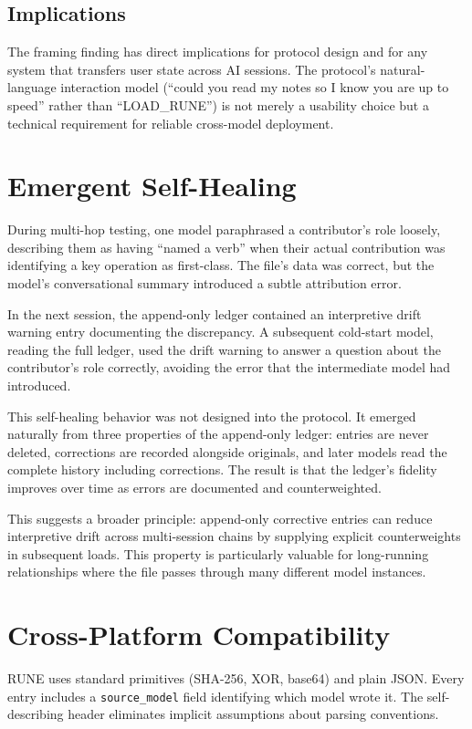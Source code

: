 \documentclass[11pt,a4paper]{article}
\begin{document}
\subsection{Implications}

The framing finding has direct implications for protocol design and for any system that transfers user state across AI sessions. The protocol's natural-language interaction model (``could you read my notes so I know you are up to speed'' rather than ``LOAD\_RUNE'') is not merely a usability choice but a technical requirement for reliable cross-model deployment.

\section{Emergent Self-Healing}

During multi-hop testing, one model paraphrased a contributor's role loosely, describing them as having ``named a verb'' when their actual contribution was identifying a key operation as first-class. The file's data was correct, but the model's conversational summary introduced a subtle attribution error.

In the next session, the append-only ledger contained an interpretive drift warning entry documenting the discrepancy. A subsequent cold-start model, reading the full ledger, used the drift warning to answer a question about the contributor's role correctly, avoiding the error that the intermediate model had introduced.

This self-healing behavior was not designed into the protocol. It emerged naturally from three properties of the append-only ledger: entries are never deleted, corrections are recorded alongside originals, and later models read the complete history including corrections. The result is that the ledger's fidelity improves over time as errors are documented and counterweighted.

This suggests a broader principle: append-only corrective entries can reduce interpretive drift across multi-session chains by supplying explicit counterweights in subsequent loads. This property is particularly valuable for long-running relationships where the file passes through many different model instances.

\section{Cross-Platform Compatibility}

RUNE uses standard primitives (SHA-256, XOR, base64) and plain JSON. Every entry includes a \texttt{source\_model} field identifying which model wrote it. The self-describing header eliminates implicit assumptions about parsing conventions.
\end{document}

